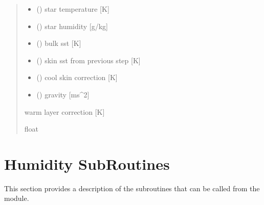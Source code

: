 \documentclass[letterpaper,10pt,english]{sphinxmanual}
\begin{document}
\begin{fulllineitems}
\begin{quote}
\begin{description}
\begin{itemize}
\item {} 
\sphinxAtStartPar
{} () \textendash{} star temperature              {[}K{]}

\item {} 
\sphinxAtStartPar
{} () \textendash{} star humidity                 {[}g/kg{]}

\item {} 
\sphinxAtStartPar
{} () \textendash{} bulk sst                    {[}K{]}

\item {} 
\sphinxAtStartPar
{} () \textendash{} skin sst from previous step {[}K{]}

\item {} 
\sphinxAtStartPar
{} () \textendash{} cool skin correction        {[}K{]}

\item {} 
\sphinxAtStartPar
{} () \textendash{} gravity                      {[}ms\textasciicircum{}\sphinxhyphen{}2{]}

\end{itemize}

\sphinxAtStartPar
{} \textendash{} warm layer correction       {[}K{]}

\sphinxAtStartPar
float

\end{description}\end{quote}

\end{fulllineitems}



\section{Humidity Sub\sphinxhyphen{}Routines}
\label{\detokenize{users_guide:humidity-sub-routines}}
\sphinxAtStartPar
This section provides a description of the sub\sphinxhyphen{}routines that can be called from the  module.
\label{\detokenize{users_guide:module-AirSeaFluxCode.hum_subs}}
\end{document}
